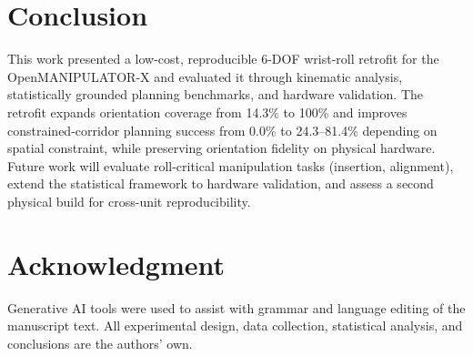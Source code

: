 \documentclass[conference]{IEEEtran}
\begin{document}
	\section{Conclusion}
	\label{sec:conclusion}
	
	This work presented a low-cost, reproducible 6-DOF wrist-roll
	retrofit for the OpenMANIPULATOR-X and evaluated it through kinematic
	analysis, statistically grounded planning benchmarks, and hardware
	validation. The retrofit expands orientation coverage from 14.3\% to
	100\% and improves constrained-corridor planning success from 0.0\%
	to 24.3--81.4\% depending on spatial constraint, while preserving
	orientation fidelity on physical hardware. Future work will evaluate
	roll-critical manipulation tasks (insertion, alignment), extend the
	statistical framework to hardware validation, and assess a second
	physical build for cross-unit reproducibility.
	
	\section*{Acknowledgment}
	Generative AI tools were used to assist with grammar and language
	editing of the manuscript text. All experimental design, data
	collection, statistical analysis, and conclusions are the authors'
	own.
	
	
	
	
\end{document}
